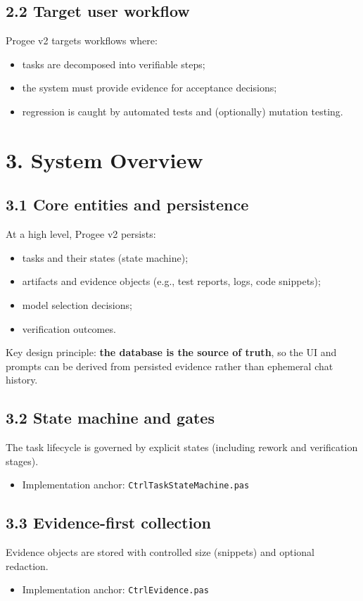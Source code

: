 \documentclass[11pt]{article}
\begin{document}
\subsection{2.2 Target user workflow}
Progee v2 targets workflows where:
\begin{itemize}
\item tasks are decomposed into verifiable steps;
\item the system must provide evidence for acceptance decisions;
\item regression is caught by automated tests and (optionally) mutation testing.
\end{itemize}

\section{3. System Overview}
\subsection{3.1 Core entities and persistence}
At a high level, Progee v2 persists:
\begin{itemize}
\item tasks and their states (state machine);
\item artifacts and evidence objects (e.g., test reports, logs, code snippets);
\item model selection decisions;
\item verification outcomes.
\end{itemize}

Key design principle: \textbf{the database is the source of truth}, so the UI and prompts can be derived from persisted evidence rather than ephemeral chat history.

\subsection{3.2 State machine and gates}
The task lifecycle is governed by explicit states (including rework and verification stages).
\begin{itemize}
\item Implementation anchor: \texttt{CtrlTaskStateMachine.pas}
\end{itemize}

\subsection{3.3 Evidence-first collection}
Evidence objects are stored with controlled size (snippets) and optional redaction.
\begin{itemize}
\item Implementation anchor: \texttt{CtrlEvidence.pas}
\end{itemize}
\end{document}
